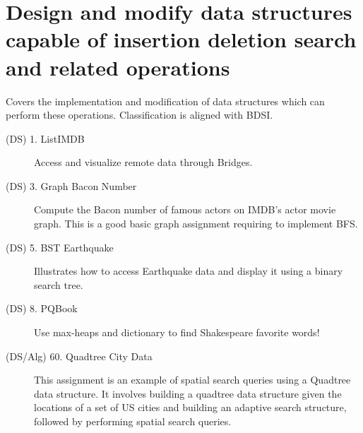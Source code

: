 \documentclass[10pt, onecoulmn]{article}
\begin{document}
\section{Design and modify data structures capable of insertion deletion search and related operations}
Covers the implementation and modification of data structures which can perform these operations. Classification is aligned with BDSI.
\begin{description}
	\item[(DS) 1. ListIMDB] Access and visualize remote data through Bridges.
	\item[(DS) 3. Graph Bacon Number] Compute the Bacon number of famous actors on IMDB's actor movie graph. This is a good basic graph assignment requiring to implement BFS.
	\item[(DS) 5. BST Earthquake] Illustrates how to access Earthquake data and display it using a binary search tree.
	\item[(DS) 8. PQBook] Use max-heaps and dictionary to find Shakespeare favorite words!
	\item[(DS/Alg) 60. Quadtree City Data] This assignment is an example of spatial search queries using a Quadtree data structure. It involves building a quadtree data structure given the locations of a set of US cities and building an adaptive search structure, followed by performing spatial search queries.
\end{description}
\end{document}
